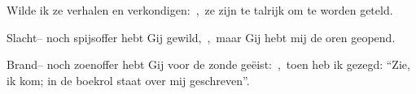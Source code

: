 \documentclass[12pt,twoside,a5paper]{article}
\begin{document}

\begin{halfparskip}
  Wilde ik ze verhalen en verkondigen:~\sep\ ze zijn te talrijk om te worden geteld.


  Slacht-- noch spijsoffer hebt Gij gewild,~\sep\ maar Gij hebt mij de oren geopend.

  Brand-- noch zoenoffer hebt Gij voor de zonde geëist:~\sep\ toen heb ik gezegd: ``Zie, ik kom; in de boekrol staat over mij geschreven''.
\end{halfparskip}

\end{document}
